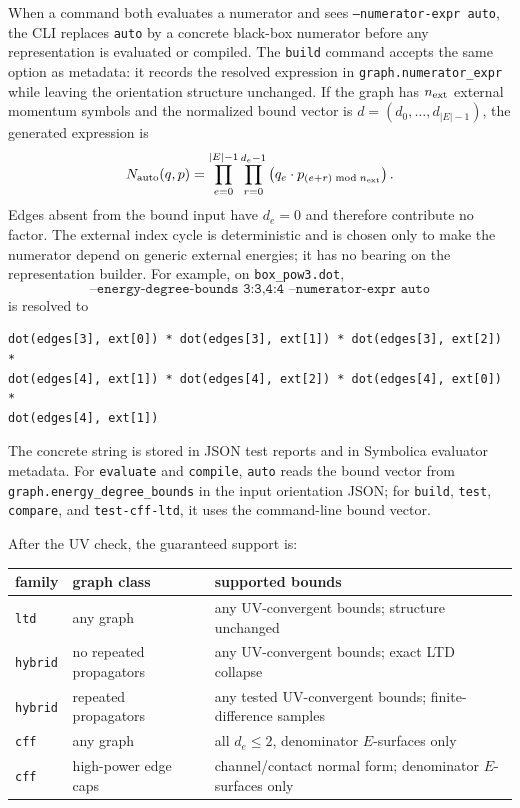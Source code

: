 \documentclass[11pt,a4paper]{report}
\begin{document}
When a command both evaluates a numerator and sees
\texttt{--numerator-expr auto}, the CLI replaces \texttt{auto} by a concrete
black-box numerator before any representation is evaluated or compiled.  The
\texttt{build} command accepts the same option as metadata: it records the
resolved expression in \texttt{graph.numerator\_expr} while leaving the
orientation structure unchanged.  If the graph has \(n_{\rm ext}\) external
momentum symbols and the normalized bound vector is
\(d=(d_0,\ldots,d_{|E|-1})\), the generated expression is
\begin{equation}
  N_{\rm auto}(q,p)
  =
  \prod_{e=0}^{|E|-1}
  \prod_{r=0}^{d_e-1}
  \left(q_e\cdot p_{(e+r)\bmod n_{\rm ext}}\right).
  \label{eq:auto-numerator}
\end{equation}
Edges absent from the bound input have \(d_e=0\) and therefore contribute no
factor.  The external index cycle is deterministic and is chosen only to make
the numerator depend on generic external energies; it has no bearing on the
representation builder.  For example, on \texttt{box\_pow3.dot},
\[
  \texttt{--energy-degree-bounds 3:3,4:4 --numerator-expr auto}
\]
is resolved to
\begin{lstlisting}
dot(edges[3], ext[0]) * dot(edges[3], ext[1]) * dot(edges[3], ext[2]) *
dot(edges[4], ext[1]) * dot(edges[4], ext[2]) * dot(edges[4], ext[0]) *
dot(edges[4], ext[1])
\end{lstlisting}
The concrete string is stored in JSON test reports and in Symbolica evaluator
metadata.  For \texttt{evaluate} and \texttt{compile}, \texttt{auto} reads the
bound vector from \texttt{graph.energy\_degree\_bounds} in the input
orientation JSON; for \texttt{build}, \texttt{test}, \texttt{compare}, and
\texttt{test-cff-ltd}, it uses the command-line bound vector.

After the UV check, the guaranteed support is:
\begin{center}
\begin{tabular}{lll}
\toprule
family & graph class & supported bounds \\
\midrule
\texttt{ltd} & any graph & any UV-convergent bounds; structure unchanged \\
\texttt{hybrid} & no repeated propagators & any UV-convergent bounds; exact LTD collapse \\
\texttt{hybrid} & repeated propagators & any tested UV-convergent bounds; finite-difference samples \\
\texttt{cff} & any graph & all \(d_e\le2\), denominator \(E\)-surfaces only \\
\texttt{cff} & high-power edge caps & channel/contact normal form; denominator \(E\)-surfaces only \\
\bottomrule
\end{tabular}
\end{center}
\end{document}
